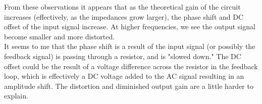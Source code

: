 \documentclass[11pt]{article}
\begin{document}
From these observations it appears that as the theoretical gain of the circuit increases (effectively, as the impedances grow larger), the phase shift and DC offset of the input signal increase. At higher frequencies, we see the output signal become smaller and more distorted.\\

It seems to me that the phase shift is a result of the input signal (or possibly the feedback signal) is passing through a resistor, and is "slowed down." The DC offset could be the result of a voltage difference across the resistor in the feedback loop, which is effectively a DC voltage added to the AC signal resulting in an amplitude shift. The distortion and diminished output gain are a little harder to explain.\\
\end{document}
